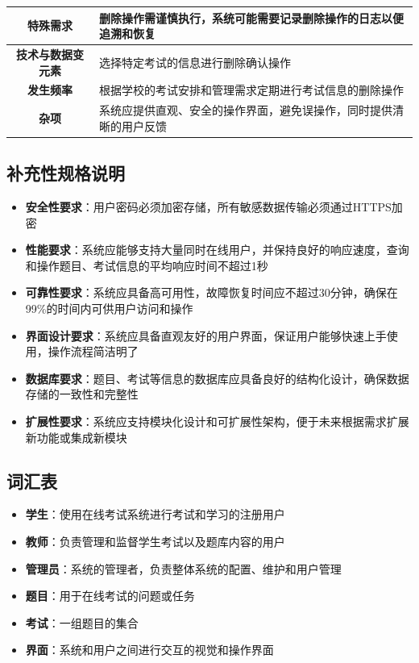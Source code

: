 \documentclass{article}
\begin{document}
\begin{centering}
\begin{longtable}{|c|m{11cm}<{\centering}|}
\textbf{特殊需求} & 删除操作需谨慎执行，系统可能需要记录删除操作的日志以便追溯和恢复 \\ \hline
\textbf{技术与数据变元素} & 选择特定考试的信息进行删除确认操作 \\ \hline
\textbf{发生频率} & 根据学校的考试安排和管理需求定期进行考试信息的删除操作 \\ \hline
\textbf{杂项} & 系统应提供直观、安全的操作界面，避免误操作，同时提供清晰的用户反馈 \\ \hline
\end{longtable}
\end{centering}

\subsection{补充性规格说明}
\begin{itemize}
    \item \textbf{安全性要求}：用户密码必须加密存储，所有敏感数据传输必须通过HTTPS加密
    \item \textbf{性能要求}：系统应能够支持大量同时在线用户，并保持良好的响应速度，查询和操作题目、考试信息的平均响应时间不超过1秒
    \item \textbf{可靠性要求}：系统应具备高可用性，故障恢复时间应不超过30分钟，确保在99\%的时间内可供用户访问和操作
    \item \textbf{界面设计要求}：系统应具备直观友好的用户界面，保证用户能够快速上手使用，操作流程简洁明了
    \item \textbf{数据库要求}：题目、考试等信息的数据库应具备良好的结构化设计，确保数据存储的一致性和完整性
    \item \textbf{扩展性要求}：系统应支持模块化设计和可扩展性架构，便于未来根据需求扩展新功能或集成新模块
\end{itemize}

\subsection{词汇表}
\begin{itemize}
    \item \textbf{学生}：使用在线考试系统进行考试和学习的注册用户
    \item \textbf{教师}：负责管理和监督学生考试以及题库内容的用户
    \item \textbf{管理员}：系统的管理者，负责整体系统的配置、维护和用户管理
    \item \textbf{题目}：用于在线考试的问题或任务
    \item \textbf{考试}：一组题目的集合
    \item \textbf{界面}：系统和用户之间进行交互的视觉和操作界面
\end{itemize}
\end{document}
